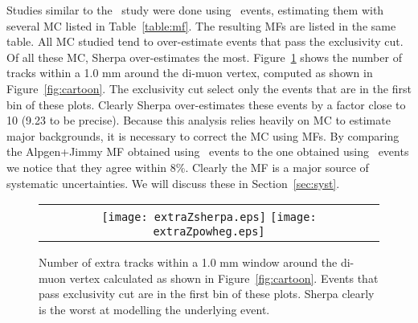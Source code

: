 \par Studies similar to the \Ztau\ study were done using \Zmm\ events, estimating them 
with several MC listed in Table~\ref{table:mf}. The resulting MFs are listed in the same table.
All MC studied tend to over-estimate events that pass the exclusivity cut. Of all these MC,
Sherpa over-estimates the most. Figure~\ref{fig:mf} shows the number of tracks within a 1.0 mm
around the di-muon vertex, computed as shown in Figure~\ref{fig:cartoon}. The exclusivity cut select 
only the events that are in the first bin of these plots. Clearly Sherpa over-estimates these 
events by a factor close to 10 (9.23 to be precise). Because this analysis relies heavily on 
MC to estimate major backgrounds, it is necessary to correct the MC using MFs. By comparing the 
Alpgen+Jimmy MF obtained using \Zmm\ events to the one obtained using \Ztau\ events we notice 
that they agree within 8\%. Clearly the MF is a major source of systematic uncertainties. We will 
discuss these in Section~\ref{sec:syst}.  

\begin{table}
\begin{center}
\caption{MFs obtained from studying \Zmm\ and \Ztau\ events and estimating them using several MC. Sherpa 
mismodels the underlying event the worst. We use Alpgen+Jimmy MC in this analysis.}
\label{table:mf}
\end{center}
\end{table}

\begin{figure}[!h]
\begin{tabular}{c}
	\texttt{[image: extraZsherpa.eps]}
	\texttt{[image: extraZpowheg.eps]}
\end{tabular}
\caption{Number of extra tracks within a 1.0 mm window around the di-muon vertex calculated as 
shown in Figure~\ref{fig:cartoon}. Events that pass exclusivity cut are in the first bin of these plots.
Sherpa clearly is the worst at modelling the underlying event. }
\label{fig:mf}
\end{figure}
